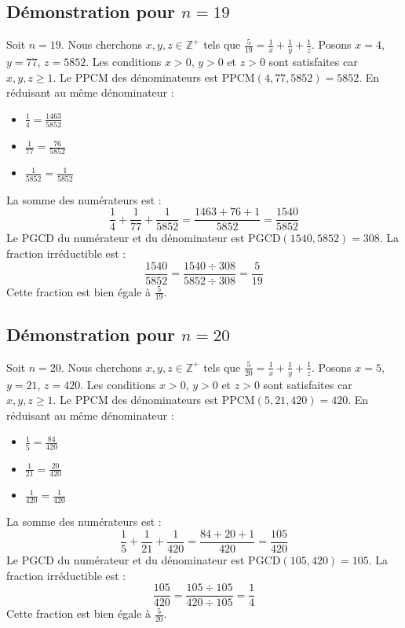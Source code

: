\documentclass[11pt,a4paper]{article}
\begin{document}
\subsection{Démonstration pour $n = 19$}
Soit $n = 19$. Nous cherchons $x, y, z \in \mathbb{Z}^{+}$ tels que $\frac{5}{19} = \frac{1}{x} + \frac{1}{y} + \frac{1}{z}$.
Posons $x = 4$, $y = 77$, $z = 5852$.
Les conditions $x > 0$, $y > 0$ et $z > 0$ sont satisfaites car $x, y, z \geq 1$.
Le PPCM des dénominateurs est $\text{PPCM}(4, 77, 5852) = 5852$.
En réduisant au même dénominateur :
\begin{itemize}
    \item $\frac{1}{4} = \frac{1463}{5852}$
    \item $\frac{1}{77} = \frac{76}{5852}$
    \item $\frac{1}{5852} = \frac{1}{5852}$
\end{itemize}
La somme des numérateurs est :
$$ \frac{1}{4} + \frac{1}{77} + \frac{1}{5852} = \frac{1463 + 76 + 1}{5852} = \frac{1540}{5852} $$
Le PGCD du numérateur et du dénominateur est $\text{PGCD}(1540, 5852) = 308$.
La fraction irréductible est :
$$ \frac{1540}{5852} = \frac{1540 \div 308}{5852 \div 308} = \frac{5}{19} $$
Cette fraction est bien égale à $\frac{5}{19}$.

\subsection{Démonstration pour $n = 20$}
Soit $n = 20$. Nous cherchons $x, y, z \in \mathbb{Z}^{+}$ tels que $\frac{5}{20} = \frac{1}{x} + \frac{1}{y} + \frac{1}{z}$.
Posons $x = 5$, $y = 21$, $z = 420$.
Les conditions $x > 0$, $y > 0$ et $z > 0$ sont satisfaites car $x, y, z \geq 1$.
Le PPCM des dénominateurs est $\text{PPCM}(5, 21, 420) = 420$.
En réduisant au même dénominateur :
\begin{itemize}
    \item $\frac{1}{5} = \frac{84}{420}$
    \item $\frac{1}{21} = \frac{20}{420}$
    \item $\frac{1}{420} = \frac{1}{420}$
\end{itemize}
La somme des numérateurs est :
$$ \frac{1}{5} + \frac{1}{21} + \frac{1}{420} = \frac{84 + 20 + 1}{420} = \frac{105}{420} $$
Le PGCD du numérateur et du dénominateur est $\text{PGCD}(105, 420) = 105$.
La fraction irréductible est :
$$ \frac{105}{420} = \frac{105 \div 105}{420 \div 105} = \frac{1}{4} $$
Cette fraction est bien égale à $\frac{5}{20}$.
\end{document}
